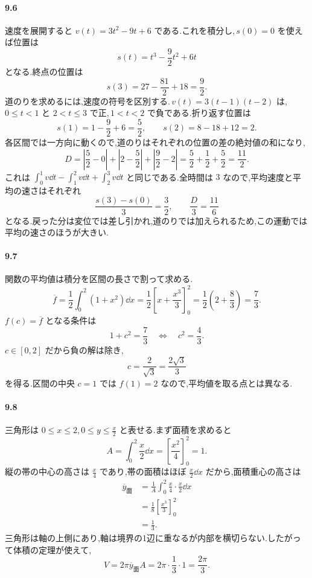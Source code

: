 \paragraph{9.6}
速度を展開すると $v(t)=3t^2-9t+6$ である.これを積分し,\,$s(0)=0$ を使えば位置は
\[
s(t)=t^3-\frac92t^2+6t
\]
となる.終点の位置は
\[
s(3)=27-\frac{81}{2}+18=\frac92.
\]
道のりを求めるには,速度の符号を区別する.\,$v(t)=3(t-1)(t-2)$ は,\,$0\le t<1$ と $2<t\le3$ で正,\,$1<t<2$ で負である.折り返す位置は
\[
s(1)=1-\frac92+6=\frac52,\qquad
s(2)=8-18+12=2.
\]
各区間では一方向に動くので,道のりはそれぞれの位置の差の絶対値の和になり,
\[
D=\left|\frac52-0\right|
 +\left|2-\frac52\right|
 +\left|\frac92-2\right|
 =\frac52+\frac12+\frac52=\frac{11}{2}.
\]
これは $\int_0^1v\dd t-\int_1^2v\dd t+\int_2^3v\dd t$ と同じである.全時間は $3$ なので,平均速度と平均の速さはそれぞれ
\[
\frac{s(3)-s(0)}{3}=\frac32,\qquad
\frac{D}{3}=\frac{11}{6}
\]
となる.戻った分は変位では差し引かれ,道のりでは加えられるため,この運動では平均の速さのほうが大きい.

\paragraph{9.7}
関数の平均値は積分を区間の長さで割って求める.
\[
\overline f=\frac12\int_0^2(1+x^2)\dd x
 =\frac12\left[x+\frac{x^3}{3}\right]_0^2
 =\frac12\left(2+\frac83\right)=\frac73.
\]
$f(c)=\overline f$ となる条件は
\[
1+c^2=\frac73
\quad\Longleftrightarrow\quad
c^2=\frac43.
\]
$c\in[0,2]$ だから負の解は除き,
\[
c=\frac{2}{\sqrt3}=\frac{2\sqrt3}{3}
\]
を得る.区間の中央 $c=1$ では $f(1)=2$ なので,平均値を取る点とは異なる.

\paragraph{9.8}
三角形は $0\le x\le2$,\,$0\le y\le\frac{x}{2}$ と表せる.まず面積を求めると
\[
A=\int_0^2\frac{x}{2}\dd x
 =\left[\frac{x^2}{4}\right]_0^2=1.
\]
縦の帯の中心の高さは $\frac{x}{4}$ であり,帯の面積はほぼ $\frac{x}{2}\dd x$ だから,面積重心の高さは
\[
\begin{aligned}
\overline y_{\mathrm{面}}
 &=\frac1A\int_0^2\frac{x}{4}\cdot\frac{x}{2}\dd x\\
 &=\frac18\left[\frac{x^3}{3}\right]_0^2\\
 &=\frac13.
\end{aligned}
\]
三角形は軸の上側にあり,軸は境界の1辺に重なるが内部を横切らない.したがって体積の定理が使えて,
\[
V=2\pi\overline y_{\mathrm{面}}A
 =2\pi\cdot\frac13\cdot1=\frac{2\pi}{3}.
\]

